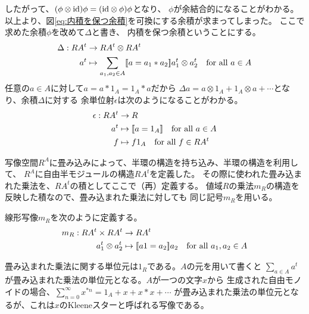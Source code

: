 		したがって、$(\phi\otimes{\operatorname{id}})\phi=({\operatorname{id}}\otimes\phi)\phi$となり、
		$\phi$が余結合的になることがわかる。
		以上より、図\eqref{eq:内積を保つ余積}を可換にする余積が求まってしまった。
		ここで求めた余積$\phi$を改めて$\Delta$と書き、
		内積を保つ余積ということにする。
		\begin{equation}\begin{split} %
			\Delta: RA^t &\to RA^t\otimes RA^t \\
				a^t &\mapsto \sum_{a_1,a_2\in A}\jump{a=a_1*a_2}a_1^t\otimes a_2^t
				\quad\text{for all }a\in A \\
		\end{split}\end{equation} %
		任意の$a\in A$に対して$a=a*1_A=1_A*a$だから
		$\Delta a=a\otimes 1_A+1_A\otimes a+\cdots$となり、余積$\Delta$に対する
		余単位射$\epsilon$は次のようになることがわかる。
		\begin{equation}\begin{split} %
			\epsilon: RA^t &\to R \\
				a^t &\mapsto \jump{a=1_A} \quad\text{for all }a\in A \\
				f &\mapsto f1_A \quad\text{for all }f\in RA^t \\
		\end{split}\end{equation} %

		写像空間$R^A$に畳み込みによって、半環の構造を持ち込み、半環の構造を利用して、
		$R^A$に自由半モジュールの構造$RA^t$を定義した。
		その際に使われた畳み込まれた乗法を、$RA^t$の積としてここで（再）定義する。
		値域$R$の乗法$m_R$の構造を反映した積なので、畳み込まれた乗法に対しても
		同じ記号$m_R$を用いる。

		\begin{definition}[畳み込まれた乗法]\label{def:畳み込まれた乗法} %
			線形写像$m_R$を次のように定義する。
			\begin{equation}\begin{split} %
				m_R: RA^t\times RA^t &\to RA^t \\
					a_1^t\otimes a_2^t &\mapsto \jump{a1=a_2}a_2 \quad\text{for all }a_1,a_2\in A \\
			\end{split}\end{equation} %
		\end{definition} %

		畳み込まれた乗法に関する単位元は$1_R$である。$A$の元を用いて書くと
		$\sum_{a\in A}a^t$が畳み込まれた乗法の単位元となる。$A$が一つの文字$x$から
		生成された自由モノイドの場合、$\sum_{n=0}^\infty x^{*n}=1_A+x+x*x+\cdots$
		が畳み込まれた乗法の単位元となるが、これは$x$のKleeneスターと呼ばれる写像である。

